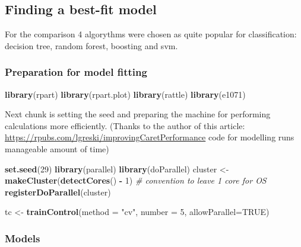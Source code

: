 \documentclass[]{article}
\newenvironment{Shaded}{\begin{snugshade}}{\end{snugshade}}
\newcommand{\KeywordTok}[1]{\textcolor[rgb]{0.13,0.29,0.53}{\textbf{#1}}}
\newcommand{\DataTypeTok}[1]{\textcolor[rgb]{0.13,0.29,0.53}{#1}}
\newcommand{\DecValTok}[1]{\textcolor[rgb]{0.00,0.00,0.81}{#1}}
\newcommand{\StringTok}[1]{\textcolor[rgb]{0.31,0.60,0.02}{#1}}
\newcommand{\CommentTok}[1]{\textcolor[rgb]{0.56,0.35,0.01}{\textit{#1}}}
\newcommand{\OtherTok}[1]{\textcolor[rgb]{0.56,0.35,0.01}{#1}}
\newcommand{\OperatorTok}[1]{\textcolor[rgb]{0.81,0.36,0.00}{\textbf{#1}}}
\newcommand{\NormalTok}[1]{#1}
\begin{document}
\subsection{Finding a best-fit model}\label{finding-a-best-fit-model}

For the comparison 4 algorythms were chosen as quite popular for
classification: decision tree, random forest, boosting and svm.

\subsubsection{Preparation for model
fitting}\label{preparation-for-model-fitting}

\begin{Shaded}
\begin{Highlighting}[]
\KeywordTok{library}\NormalTok{(rpart) }
\KeywordTok{library}\NormalTok{(rpart.plot) }
\KeywordTok{library}\NormalTok{(rattle)}
\KeywordTok{library}\NormalTok{(e1071)}
\end{Highlighting}
\end{Shaded}

Next chunk is setting the seed and preparing the machine for performing
calculations more efficiently. (Thanks to the author of this article:
\url{https://rpubs.com/lgreski/improvingCaretPerformance} code for
modelling runs manageable amount of time)

\begin{Shaded}
\begin{Highlighting}[]
\KeywordTok{set.seed}\NormalTok{(}\DecValTok{29}\NormalTok{)}
\KeywordTok{library}\NormalTok{(parallel)}
\KeywordTok{library}\NormalTok{(doParallel)}
\NormalTok{cluster <-}\StringTok{ }\KeywordTok{makeCluster}\NormalTok{(}\KeywordTok{detectCores}\NormalTok{() }\OperatorTok{-}\StringTok{ }\DecValTok{1}\NormalTok{) }\CommentTok{# convention to leave 1 core for OS}
\KeywordTok{registerDoParallel}\NormalTok{(cluster)}

\NormalTok{tc <-}\StringTok{ }\KeywordTok{trainControl}\NormalTok{(}\DataTypeTok{method =} \StringTok{"cv"}\NormalTok{, }\DataTypeTok{number =} \DecValTok{5}\NormalTok{, }
        \DataTypeTok{allowParallel=}\OtherTok{TRUE}\NormalTok{)}
\end{Highlighting}
\end{Shaded}

\subsubsection{Models}\label{models}
\end{document}
